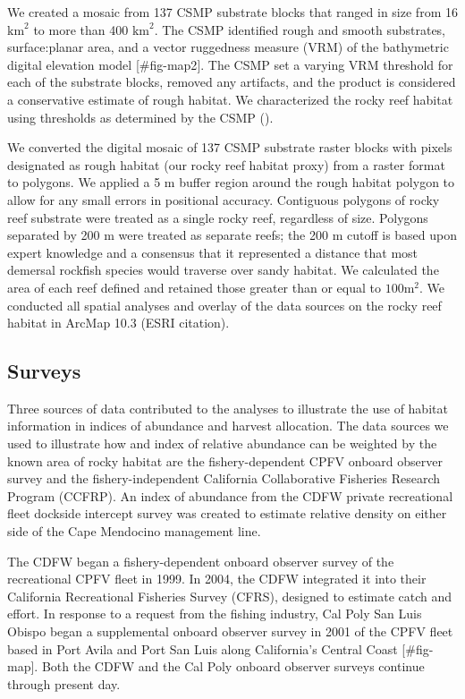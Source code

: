 \documentclass[
  12pt,
  authoryear,
  preprint,
  3p]{elsarticle}
\begin{document}
We created a mosaic from 137 CSMP substrate blocks that ranged in size
from 16 \(\mathrm{km}^2\) to more than 400 \(\mathrm{km}^2\). The CSMP
identified rough and smooth substrates, surface:planar area, and a
vector ruggedness measure (VRM) of the bathymetric digital elevation
model {[}\#fig-map2{]}. The CSMP set a varying VRM threshold for each of
the substrate blocks, removed any artifacts, and the product is
considered a conservative estimate of rough habitat. We characterized
the rocky reef habitat using thresholds as determined by the CSMP
(\citet{CSUMB:2014:CSM}).

We converted the digital mosaic of 137 CSMP substrate raster blocks with
pixels designated as rough habitat (our rocky reef habitat proxy) from a
raster format to polygons. We applied a 5 m buffer region around the
rough habitat polygon to allow for any small errors in positional
accuracy. Contiguous polygons of rocky reef substrate were treated as a
single rocky reef, regardless of size. Polygons separated by 200 m were
treated as separate reefs; the 200 m cutoff is based upon expert
knowledge and a consensus that it represented a distance that most
demersal rockfish species would traverse over sandy habitat. We
calculated the area of each reef defined and retained those greater than
or equal to \(100 \mathrm{m^2}\). We conducted all spatial analyses and
overlay of the data sources on the rocky reef habitat in ArcMap 10.3
(ESRI citation).

\hypertarget{surveys}{%
\subsection{Surveys}\label{surveys}}

Three sources of data contributed to the analyses to illustrate the use
of habitat information in indices of abundance and harvest allocation.
The data sources we used to illustrate how and index of relative
abundance can be weighted by the known area of rocky habitat are the
fishery-dependent CPFV onboard observer survey and the
fishery-independent California Collaborative Fisheries Research Program
(CCFRP). An index of abundance from the CDFW private recreational fleet
dockside intercept survey was created to estimate relative density on
either side of the Cape Mendocino management line.

The CDFW began a fishery-dependent onboard observer survey of the
recreational CPFV fleet in 1999. In 2004, the CDFW integrated it into
their California Recreational Fisheries Survey (CFRS), designed to
estimate catch and effort. In response to a request from the fishing
industry, Cal Poly San Luis Obispo began a supplemental onboard observer
survey in 2001 of the CPFV fleet based in Port Avila and Port San Luis
along California's Central Coast {[}\#fig-map{]}. Both the CDFW and the
Cal Poly onboard observer surveys continue through present day.
\end{document}
